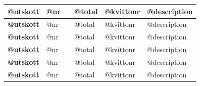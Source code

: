 \documentclass{article}
\begin{document}
\hspace{-0.3in}
\begin{tabular}{|p{0.8in}|p{0.3in}|p{1.2in}|p{0.7in}|p{0.5in}|p{2.3in}|} %
    \hline
    {\footnotesize \qquad} \newline \textbf{\qquad @utskott} & \qquad \newline @nr & \qquad & \qquad \newline @total & \qquad \newline @kvittonr & \qquad \newline @description \\ \hline
    {\footnotesize \qquad} \newline \textbf{\qquad @utskott} & \qquad \newline @nr & \qquad & \qquad \newline @total & \qquad \newline @kvittonr & \qquad \newline @description \\ \hline
    {\footnotesize \qquad} \newline \textbf{\qquad @utskott} & \qquad \newline @nr & \qquad & \qquad \newline @total & \qquad \newline @kvittonr & \qquad \newline @description \\ \hline
    {\footnotesize \qquad} \newline \textbf{\qquad @utskott} & \qquad \newline @nr & \qquad & \qquad \newline @total & \qquad \newline @kvittonr & \qquad \newline @description \\ \hline
    {\footnotesize \qquad} \newline \textbf{\qquad @utskott} & \qquad \newline @nr & \qquad & \qquad \newline @total & \qquad \newline @kvittonr & \qquad \newline @description \\ \hline
    {\footnotesize \qquad} \newline \textbf{\qquad @utskott} & \qquad \newline @nr & \qquad & \qquad \newline @total & \qquad \newline @kvittonr & \qquad \newline @description \\ \hline

\end{tabular}
\end{document}
